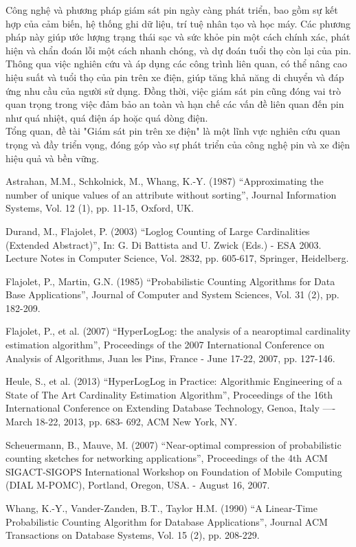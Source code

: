 \documentclass[a4paper,13pt]{article}
\theoremstyle{mytheor}
\begin{document}
Công nghệ và phương pháp giám sát pin ngày càng phát triển, bao gồm sự kết hợp của cảm biến, hệ thống ghi dữ liệu, trí tuệ nhân tạo và học máy. Các phương pháp này giúp ước lượng trạng thái sạc và sức khỏe pin một cách chính xác, phát hiện và chẩn đoán lỗi một cách nhanh chóng, và dự đoán tuổi thọ còn lại của pin.\\

Thông qua việc nghiên cứu và áp dụng các công trình liên quan, có thể nâng cao hiệu suất và tuổi thọ của pin trên xe điện, giúp tăng khả năng di chuyển và đáp ứng nhu cầu của người sử dụng. Đồng thời, việc giám sát pin cũng đóng vai trò quan trọng trong việc đảm bảo an toàn và hạn chế các vấn đề liên quan đến pin như quá nhiệt, quá điện áp hoặc quá dòng điện.\\

Tổng quan, đề tài "Giám sát pin trên xe điện" là một lĩnh vực nghiên cứu quan trọng và đầy triển vọng, đóng góp vào sự phát triển của công nghệ pin và xe điện hiệu quả và bền vững.\\

\begin{thebibliography}{19}
    \bibitem
    [As87] Astrahan, M.M., Schkolnick, M., Whang, K.-Y. (1987)
    “Approximating the number of unique values of an attribute without
    sorting”, Journal Information Systems, Vol. 12 (1), pp. 11-15,
    Oxford, UK.
    
    \bibitem[Du03] Durand, M., Flajolet, P. (2003) “Loglog Counting of Large
    Cardinalities (Extended Abstract)”, In: G. Di Battista and U.
    Zwick (Eds.) - ESA 2003. Lecture Notes in Computer Science, Vol.
    2832, pp. 605-617, Springer, Heidelberg.
    
    \bibitem[Fl85] Flajolet, P., Martin, G.N. (1985) “Probabilistic Counting
    Algorithms for Data Base Applications”, Journal of Computer and
    System Sciences, Vol. 31 (2), pp. 182-209.
    
    \bibitem[Fl07] Flajolet, P., et al. (2007) “HyperLogLog: the analysis of a nearoptimal cardinality estimation algorithm”, Proceedings of the 2007
    International Conference on Analysis of Algorithms, Juan les Pins,
    France - June 17-22, 2007, pp. 127-146.
    
    \bibitem[He13] Heule, S., et al. (2013) “HyperLogLog in Practice: Algorithmic
    Engineering of a State of The Art Cardinality Estimation Algorithm”, Proceedings of the 16th International Conference on Extending
    Database Technology, Genoa, Italy —- March 18-22, 2013, pp. 683-
    692, ACM New York, NY.
    
    \bibitem[Sc07] Scheuermann, B., Mauve, M. (2007) “Near-optimal compression
    of probabilistic counting sketches for networking applications”,
    Proceedings of the 4th ACM SIGACT-SIGOPS International
    Workshop on Foundation of Mobile Computing (DIAL M-POMC),
    Portland, Oregon, USA. - August 16, 2007.
    
    \bibitem[Wh90] Whang, K.-Y., Vander-Zanden, B.T., Taylor H.M. (1990)
    “A Linear-Time Probabilistic Counting Algorithm for Database
    Applications”, Journal ACM Transactions on Database Systems,
    Vol. 15 (2), pp. 208-229.
\end{thebibliography}
\end{document}
